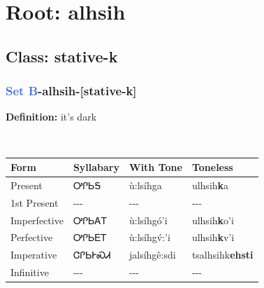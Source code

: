 \needspace{4in}
\section*{Root: alhsih}
\nopagebreak
{}
\needspace{3in}
\subsection*{Class: stative-k}
\nopagebreak
\needspace{2in}
\subsubsection*{\textcolor{RoyalBlue}{Set B}{-}\textbf{alhsih}{-}[stative-k]}
\nopagebreak
\textbf{Definition: } it{\textquoteright}s dark
\\[0.5em]
\begin{tabularx}{\textwidth}{l X X X}%
\toprule%
\textbf{Form}&\textbf{Syllabary}&\textbf{With Tone}&\textbf{Toneless}\\%
\midrule%
Present&ᎤᎵᏏᎦ&ù:lsíhga&ulhsih\textbf{k}a\\%
1st Present&{-}{-}{-}&{-}{-}{-}&{-}{-}{-}\\%
Imperfective&ᎤᎵᏏᎪᎢ&ù:lsíhgó’i&ulhsih\textbf{k}o'i\\%
Perfective&ᎤᎵᏏᎬᎢ&ù:lsíhgv́:’i&ulhsih\textbf{k}v'i\\%
Imperative&ᏣᎵᏏᎨᏍᏗ&jalsíhgê:sdi&tsalhsihk\textbf{ehsti}\\%
Infinitive&{-}{-}{-}&{-}{-}{-}&{-}{-}{-}\\%
\bottomrule%
\end{tabularx}
\\[1em]